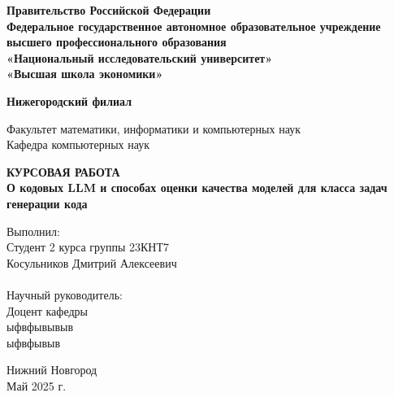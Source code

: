 \documentclass[14pt]{article}
\theoremstyle{definition}
\begin{document}
\begin{titlepage}
  \begin{center}
    \normalsize
   \textbf {Правительство Российской Федерации\\ 
Федеральное государственное автономное образовательное учреждение\\
   высшего профессионального образования\\
    «Национальный исследовательский университет» \\
     «Высшая школа экономики»}
   

    
    
    
    \textbf {Нижегородский филиал}
    
  \vfill
    Факультет математики, информатики и компьютерных наук\\
    Кафедра компьютерных наук
    
   
    \vfill

    \textbf{ КУРСОВАЯ РАБОТА}\\[5mm]
    
    {\normalsize  \textbf{О кодовых LLM и способах оценки качества моделей для класса задач
генерации кода}}
    
  \bigskip
    
    
\end{center}
\vfill

\newlength{\ML}
\hfill
\begin{minipage}{0.5\textwidth}
  Выполнил:\\
 Студент 2 курса группы 23КНТ7    
   \\
 Косульников Дмитрий Алексеевич\\ 


 \\Научный руководитель:\\
 Доцент кафедры\\ 
 ыфвфывывыв\\
ыфвфывыв\\
  \vspace{1cm}
 {\hspace{2.5cm}}
\end{minipage}%
\vfill

\begin{center}
  Нижний Новгород\\Май 2025 г.
\end{center}

\end{titlepage}
\end{document}

